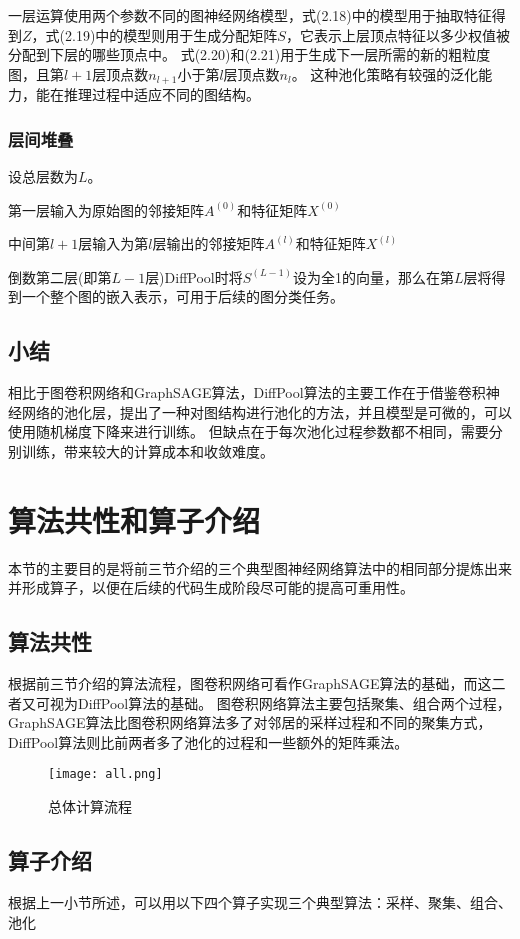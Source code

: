 一层运算使用两个参数不同的图神经网络模型，式(2.18)中的模型用于抽取特征得到$Z$，式(2.19)中的模型则用于生成分配矩阵$S$，它表示上层顶点特征以多少权值被分配到下层的哪些顶点中。
式(2.20)和(2.21)用于生成下一层所需的新的粗粒度图，且第$l+1$层顶点数$n_{l+1}$小于第$l$层顶点数$n_l$。
这种池化策略有较强的泛化能力，能在推理过程中适应不同的图结构。

\subsubsection{层间堆叠}
设总层数为$L$。

第一层输入为原始图的邻接矩阵$A^{(0)}$和特征矩阵$X^{(0)}$

中间第$l+1$层输入为第$l$层输出的邻接矩阵$A^{(l)}$和特征矩阵$X^{(l)}$

倒数第二层(即第$L-1$层)DiffPool时将$S^{(L-1)}$设为全1的向量，那么在第$L$层将得到一个整个图的嵌入表示，可用于后续的图分类任务。

\subsection{小结}
相比于图卷积网络和GraphSAGE算法，DiffPool算法的主要工作在于借鉴卷积神经网络的池化层，提出了一种对图结构进行池化的方法，并且模型是可微的，可以使用随机梯度下降来进行训练。
但缺点在于每次池化过程参数都不相同，需要分别训练，带来较大的计算成本和收敛难度。

\section{算法共性和算子介绍}
本节的主要目的是将前三节介绍的三个典型图神经网络算法中的相同部分提炼出来并形成算子，以便在后续的代码生成阶段尽可能的提高可重用性。

\subsection{算法共性}
根据前三节介绍的算法流程，图卷积网络可看作GraphSAGE算法的基础，而这二者又可视为DiffPool算法的基础。
图卷积网络算法主要包括聚集、组合两个过程，GraphSAGE算法比图卷积网络算法多了对邻居的采样过程和不同的聚集方式，DiffPool算法则比前两者多了池化的过程和一些额外的矩阵乘法。

\begin{figure}[htb]
    \centering
    \texttt{[image: all.png]}
    \caption{总体计算流程}
\end{figure}

\subsection{算子介绍}
根据上一小节所述，可以用以下四个算子实现三个典型算法：采样、聚集、组合、池化
